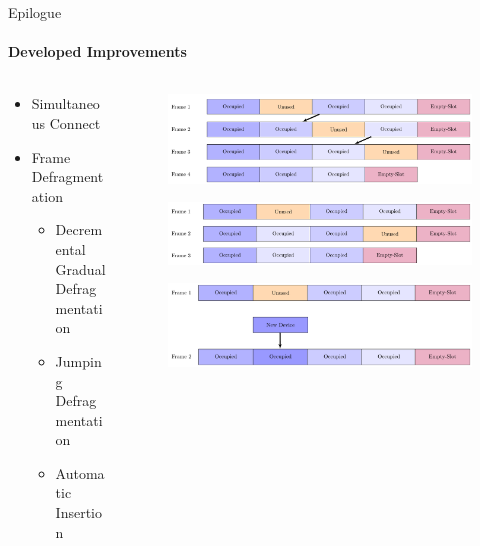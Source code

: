         \begin{frame}[t]{Epilogue}\framesubtitle{Developed Improvements}
            \begin{columns}[T]
                \begin{column}{0.48\textwidth}
                    \begin{itemize}
                        \item Simultaneous Connect
                        \item Frame Defragmentation
                            \begin{itemize}
                                \item Decremental Gradual Defragmentation
                                \item Jumping Defragmentation
                                \item Automatic Insertion
                            \end{itemize}
                    \end{itemize}
                \end{column}
                \begin{column}{.48\textwidth}
                    \begin{figure}
                        \includegraphics[width=1\textwidth]{images/dgd.pdf}
                    \end{figure}
                    \begin{figure}
                        \includegraphics[width=1\textwidth]{images/jd.pdf}
                    \end{figure}
                    \begin{figure}
                        \includegraphics[width=1\textwidth]{images/aiut.pdf}
                    \end{figure}
                \end{column}
            \end{columns}
        \end{frame}

